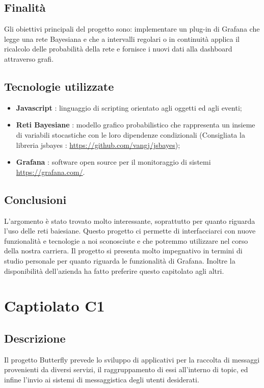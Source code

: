         \subsection{Finalità}
            Gli obiettivi principali del progetto sono: implementare un plug-in di Grafana che legge una rete Bayesiana e che a intervalli regolari o in continuità applica il ricalcolo delle probabilità della rete e fornisce i nuovi dati alla dashboard attraverso grafi.
        \subsection{Tecnologie utilizzate}
            \begin{itemize}
                \item \textbf{Javascript} : linguaggio di scripting orientato agli oggetti ed agli eventi;
                \item \textbf{Reti Bayesiane} : modello grafico probabilistico che rappresenta un insieme di variabili stocastiche con le loro dipendenze condizionali (Consigliata la libreria jsbayes : \url{https://github.com/vangj/jsbayes});
                \item \textbf{Grafana} : software open source per il monitoraggio di sistemi \url{https://grafana.com/}.
            \end{itemize}
         \subsection{Conclusioni}
            L'argomento è stato trovato molto interessante, soprattutto per quanto riguarda l'uso delle reti baiesiane. Questo progetto ci permette di interfacciarci con nuove funzionalità e tecnologie a noi sconosciute e che potremmo utilizzare nel corso della nostra carriera.
            Il progetto si presenta molto impegnativo in termini di studio personale per quanto riguarda le funzionalità di Grafana.
            Inoltre la disponibilità dell'azienda ha fatto preferire questo capitolato agli altri.
\newpage

	\section{Captiolato C1}
        \subsection{Descrizione}
            Il progetto Butterfly prevede lo sviluppo di applicativi per la raccolta di messaggi provenienti da diversi servizi, il raggruppamento di essi all'interno di topic, ed infine l'invio ai sistemi di messaggistica degli utenti desiderati.
